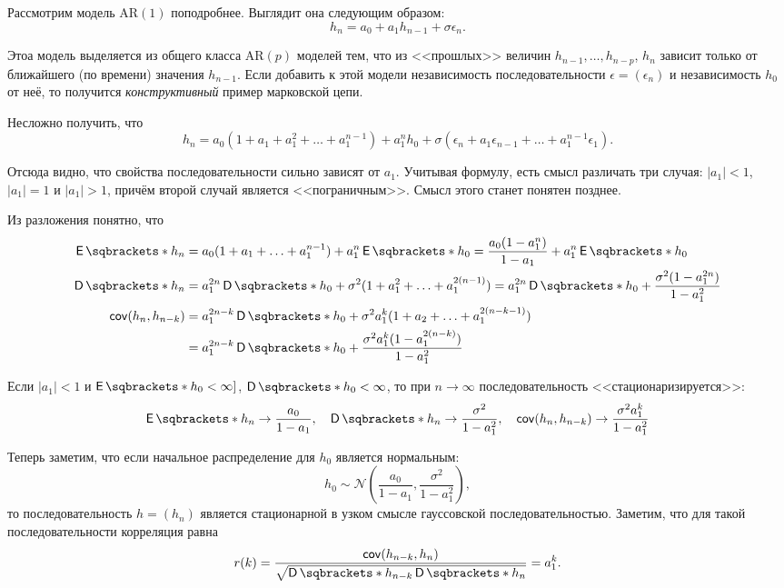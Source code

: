 Рассмотрим модель \(\mathrm{AR}(1)\) поподробнее. Выглядит она следующим 
образом:
\[
	h_{n} = a_{0} + a_{1}h_{n - 1} + \sigma\epsilon_{n}.
\]

Этоа модель выделяется из общего класса \(\mathrm{AR}(p)\) моделей тем, что из 
<<прошлых>> величин \(h_{n - 1}, \ldots, h_{n - p}\), \(h_{n}\) зависит только 
от ближайшего (по времени) значения \(h_{n - 1}\). Если добавить к этой модели 
независимость последовательности \(\epsilon = (\epsilon_{n})\) и независимость 
\(h_{0}\) от неё, то получится \emph{конструктивный} пример марковской цепи.

Несложно получить, что
\[
	h_{n} = a_{0}(1 + a_{1} + a_{1}^{2} + \ldots + a_{1}^{n - 1}) + 
	a_{1}^{n}h_{0} + \sigma(\epsilon_{n} + a_{1}\epsilon_{n - 1}+ \ldots + 
	a_{1}^{n - 1}\epsilon_{1}).
\]

Отсюда видно, что свойства последовательности сильно зависят от \(a_{1}\). 
Учитывая формулу, есть смысл различать три случая: \(|a_{1}| < 1\), \(|a_{1}| = 
1\) и \(|a_{1}| > 1\), причём второй случай является <<пограничным>>. Смысл 
этого станет понятен позднее.

Из разложения понятно, что %
\begin{align*}
	\E{h_{n}} &= a_{0}(1 + a_{1} + \ldots + a_{1}^{n - 1}) + a_{1}^{n}\E{h_{0}} 
	= \frac{a_{0}(1 - a_{1}^{n})}{1 - a_{1}} + a_{1}^{n}\E{h_{0}} \\
	\D{h_{n}} &= a_{1}^{2n}\D{h_{0}} + \sigma^{2}(1 + a_{1}^{2} + \ldots + 
	a_{1}^{2(n - 1)}) = a_{1}^{2n}\D{h_{0}} + \frac{\sigma^{2}(1 - 
	a_{1}^{2n})}{1 - a_{1}^{2}}\\
	\cov(h_{n}, h_{n - k}) &= a_{1}^{2n - k}\D{h_{0}} + \sigma^{2}a_{1}^{k}(1 + 
	a_{2} + \ldots + a_{1}^{2(n - k - 1)}) \\
	&= a_{1}^{2n - k}\D{h_{0}} + \frac{\sigma^{2}a_{1}^{k}(1 - a_{1}^{2(n - 
	k)})}{1 - a_{1}^{2}} \\
\end{align*}

Если \(|a_{1}| < 1\) и \(\E{h_{0}} < \infty]\), \(\D{h_{0}} < \infty\), то при 
\(n \to \infty\) последовательность <<стационаризируется>>:
\[
	\E{h_{n}} \to \frac{a_{0}}{1 - a_{1}}, \quad \D{h_{n}} \to 
	\frac{\sigma^{2}}{1 - a_{1}^{2}}, \quad \cov(h_{n}, h_{n - k}) \to 
	\frac{\sigma^{2}a_{1}^{k}}{1 - a_{1}^{2}}
\]

Теперь заметим, что если начальное распределение для \(h_{0}\) является 
нормальным:
\[
	h_{0} \sim \mathcal{N}\left(\frac{a_{0}}{1 - a_{1}}, \frac{\sigma^{2}}{1 - 
	a_{1}^{2}}\right),
\]
то последовательность \(h = (h_{n})\) является стационарной в узком смысле 
гауссовской последовательностью. Заметим, что для такой последовательности 
корреляция равна
\[
	r(k) = \frac{\cov(h_{n - k}, h_{n})}{\sqrt{\D{h_{n - k}}\D{h_{n}}}} = 
	a_{1}^{k}.
\] 

